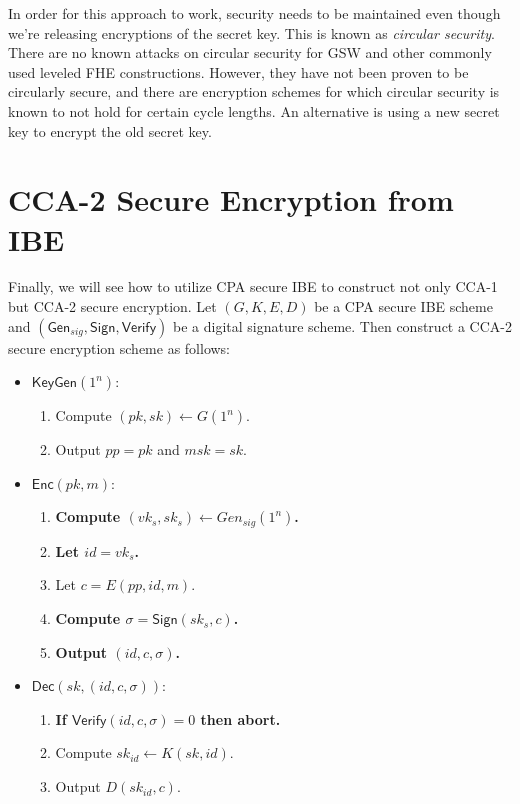 \documentclass[12pt]{tufte-book}
\begin{document}
In order for this approach to work, security needs to be maintained even though we're releasing encryptions of the secret key. 
This is known as \emph{circular security}. 
There are no known attacks on circular security for GSW and other commonly used leveled FHE constructions. 
However, they have not been proven to be circularly secure, and there are encryption schemes for which circular security is known to not hold for certain cycle lengths. 
An alternative is using a new secret key to encrypt the old secret key. 



\section{CCA-2 Secure Encryption from IBE} 

Finally, we will see how to utilize CPA secure IBE to construct not only CCA-1 but CCA-2 secure encryption. 
Let $(G, K, E, D)$ be a CPA secure IBE scheme and $(\mathsf{Gen}_{sig}, \mathsf{Sign}, \mathsf{Verify})$ be a digital signature scheme. 
Then construct a CCA-2 secure encryption scheme as follows: 
\begin{itemize}
    \item $\mathsf{KeyGen}(1^n)$: 
    \begin{enumerate}
        \item Compute $(pk, sk) \leftarrow G(1^n)$. 

        \item Output $pp = pk$ and $msk = sk$. 
    \end{enumerate}

    \item $\mathsf{Enc}(pk, m)$: 
    \begin{enumerate}
        \item \textbf{Compute $(vk_s, sk_s) \leftarrow Gen_{sig}(1^n)$.}

        \item \textbf{Let $id = vk_s$.}

        \item Let $c = E(pp, id, m)$. 

        \item \textbf{Compute $\sigma = \mathsf{Sign}(sk_s, c)$.} 

        \item \textbf{Output $(id, c, \sigma)$.} 
    \end{enumerate}

    \item $\mathsf{Dec}(sk, (id,c,\sigma))$: 
    \begin{enumerate}
        \item \textbf{If $\mathsf{Verify}(id, c, \sigma) = 0$ then abort.} 

        \item Compute $sk_{id} \leftarrow K(sk, id)$. 

        \item Output $D(sk_{id}, c)$. 
    \end{enumerate}
\end{itemize}
\end{document}
